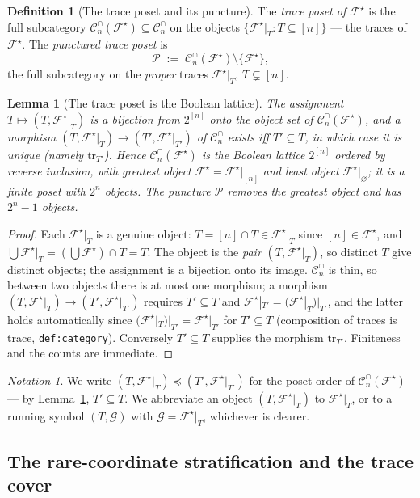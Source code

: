 \documentclass[11pt,oneside]{amsart}
\theoremstyle{plain}
\newtheorem{lemma}[theorem]{Lemma}
\theoremstyle{definition}
\newtheorem{definition}[theorem]{Definition}
\theoremstyle{remark}
\newtheorem{notation}[theorem]{Notation}
\theoremstyle{honeststyle}
\newcommand{\F}{\mathcal{F}}
\newcommand{\G}{\mathcal{G}}
\newcommand{\Fstar}{\F^{\star}}
\newcommand{\Cn}{\mathcal{C}^{\cap}_n}
\newcommand{\tr}{\mathrm{tr}}
\newcommand{\Pp}{\mathcal{P}}
\begin{document}
\begin{definition}[The trace poset and its puncture]
\label{def:poset}
The \emph{trace poset of $\Fstar$} is the full subcategory
$\Cn(\Fstar)\subseteq\Cn$ on the objects $\{\Fstar|_{T}:T\subseteq
[n]\}$ --- the traces of $\Fstar$. The \emph{punctured trace poset} is
\[
  \Pp\;:=\;\Cn(\Fstar)\setminus\{\Fstar\},
\]
the full subcategory on the \emph{proper} traces $\Fstar|_{T}$,
$T\subsetneq[n]$.
\end{definition}

\begin{lemma}[The trace poset is the Boolean lattice]
\label{lem:boolean}
The assignment $T\mapsto(T,\Fstar|_{T})$ is a bijection from
$2^{[n]}$ onto the object set of $\Cn(\Fstar)$, and a morphism
$(T,\Fstar|_{T})\to(T',\Fstar|_{T'})$ of $\Cn$ exists iff
$T'\subseteq T$, in which case it is unique (namely $\tr_{T'}$).
Hence $\Cn(\Fstar)$ is the Boolean lattice $2^{[n]}$ ordered by
\emph{reverse} inclusion, with greatest object $\Fstar=\Fstar|_{[n]}$
and least object $\Fstar|_{\varnothing}$; it is a finite poset with
$2^{n}$ objects. The puncture $\Pp$ removes the greatest object and
has $2^{n}-1$ objects.
\end{lemma}

\begin{proof}
Each $\Fstar|_{T}$ is a genuine object: $T=[n]\cap T\in\Fstar|_{T}$
since $[n]\in\Fstar$, and $\bigcup\Fstar|_{T}=(\bigcup\Fstar)\cap T=T$.
The object is the \emph{pair} $(T,\Fstar|_{T})$, so distinct $T$ give
distinct objects; the assignment is a bijection onto its image. $\Cn$
is thin, so between two objects there is at most one morphism; a
morphism $(T,\Fstar|_{T})\to(T',\Fstar|_{T'})$ requires $T'\subseteq
T$ and $\Fstar|_{T'}=(\Fstar|_{T})|_{T'}$, and the latter holds
automatically since $(\Fstar|_{T})|_{T'}=\Fstar|_{T'}$ for
$T'\subseteq T$ (composition of traces is trace, \texttt{def:category}).
Conversely $T'\subseteq T$ supplies the morphism $\tr_{T'}$.
Finiteness and the counts are immediate.
\end{proof}

\begin{notation}
\label{not:posetorder}
We write $(T,\Fstar|_{T})\preceq(T',\Fstar|_{T'})$ for the poset order
of $\Cn(\Fstar)$ --- by Lemma~\ref{lem:boolean}, $T'\subseteq T$. We
abbreviate an object $(T,\Fstar|_{T})$ to $\Fstar|_{T}$, or to a
running symbol $(T,\G)$ with $\G=\Fstar|_{T}$, whichever is clearer.
\end{notation}

\subsection{The rare-coordinate stratification and the trace cover}
\label{ssec:cover}
\end{document}
